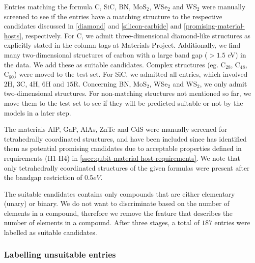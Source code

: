 Entries matching the formula C, SiC, BN, MoS$_2$, WSe$_2$ and WS$_2$ were manually screened to see if the entries have a matching structure to the respective candidates discussed in \autoref{diamond} and \ref{silicon-carbide} and \ref{promising-material-hosts}, respectively.
For C, we admit three-dimensional diamond-like structures as explicitly stated in the column tags at Materials Project. Additionally, we find many two-dimensional structures of carbon with a large band gap ($>1.5$ eV) in the data. We add these as suitable candidates. Complex structures (eg. C$_{28}$, C$_{48}$, C$_{60}$) were moved to the test set. For SiC, we admitted all entries, which involved $2$H, $3$C, $4$H, $6$H and $15$R. Concerning BN, MoS$_2$, WSe$_2$ and  WS$_2$, we only admit two-dimensional structures. For non-matching structures not mentioned so far, we move them to the test set to see if they will be predicted suitable or not by the models in a later step.



The materials AlP, GaP, AlAs, ZnTe and CdS were manually screened for tetrahedrally coordinated structures, and have been included since \citeauthor{Weber2010} \cite{Weber2010} has identified them as potential promising candidates due to acceptable properties defined in requirements (H1-H4) in \autoref{ssec:qubit-material-host-requirements}. We note that only tetrahedrally coordinated structures of the given formulas were present after the bandgap restriction of $0.5eV$.

The suitable candidates contains only compounds that are either elementary (unary) or binary. We do not want to discriminate based on the number of elements in a compound, therefore we remove the feature that describes the number of elements in a compound. After three stages, a total of $187$ entries were labelled as suitable candidates.

\subsubsection{Labelling unsuitable entries}

